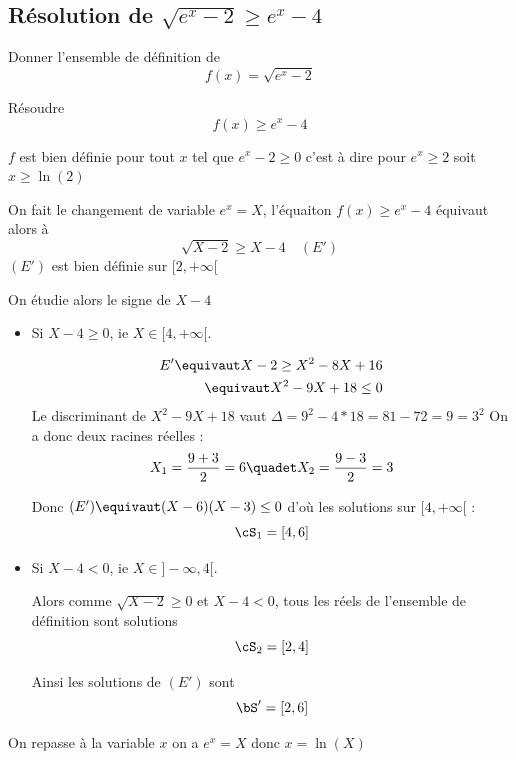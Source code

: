 \subsection{Résolution de $\sqrt{e^x-2} \geq e^{x}-4$}
\begin{exercice}
Donner l'ensemble de définition de 
$$f(x) = \sqrt{e^x-2}$$

Résoudre $$f(x)\geq e^{x}-4$$
\end{exercice}

\begin{correction}
$f$ est bien définie pour tout $x$ tel que $e^x-2\geq 0$ c'est à dire pour $e^x\geq2$ soit $x\geq \ln(2)$

\conclusion{ $D_f =[\ln(2),+\infty[$}

On fait le changement de variable $e^x=X$, l'équaiton $f(x) \geq e^x-4$ équivaut alors à 
$$\sqrt{X-2} \geq X-4 \quad (E')$$
$(E')$ est bien définie sur $[2,+\infty[$

On étudie alors le signe de $X-4$

\begin{itemize}
\item Si $X-4\geq 0$, ie $X\in [4,+\infty[$. 

\begin{align*}
E' \equivaut X-2 \geq X^2 - 8X +16\\
	\equivaut X^2 -9X +18\leq 0
\end{align*}
Le discriminant de $X^2 -9X +18$ vaut $\Delta =9^2 - 4*18 = 81- 72 =9=3^2$
On a donc deux racines réelles : 
$$X_1= \frac{9 +3}{2} = 6 \quadet X_2 = \frac{9-3}{2}= 3$$

Donc $(E') \equivaut  (X-6)(X-3)\leq 0$ d'où les solutions sur $ [4,+\infty[$ : 
$$\cS_1= [4,6]$$


\item Si $X-4<0$, ie $X\in ]-\infty,4[$. 

Alors comme $\sqrt{X-2} \geq 0$  et $X-4<0$, tous les réels de l'ensemble de définition sont solutions 
$$\cS_2 = [2,4]$$


Ainsi les solutions de $(E')$ sont 
$$\bS' = [2,6]$$



\end{itemize}

On repasse à la variable $x$ on a $e^x =X$ donc $x =\ln(X)$


\end{correction}




